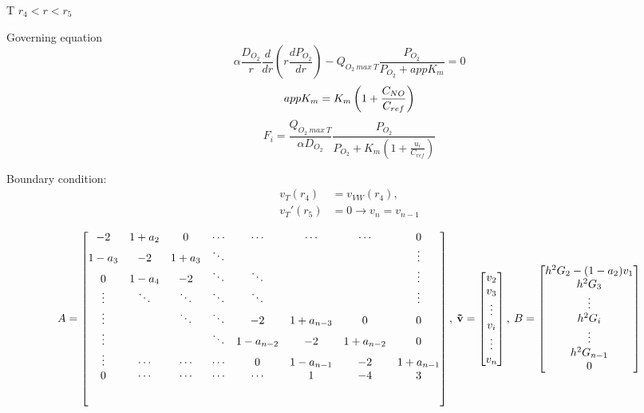 \documentclass[8pt, a4paper]{article}
\begin{document}
  T $r_4<r<r_5$
  
  Governing equation
  \begin{equation*}
  \alpha\frac{D_{O_2}}{r}\frac{d}{dr}\left(r\frac{dP_{O_2}}{dr}\right)-Q_{O_2\:
    max\:T}\frac{P_{O_2}}{P_{O_2}+appK_m}=0
  \end{equation*}
  \begin{equation}
  appK_m=K_m\left(1+\frac{C_{NO}}{C_{ref}}\right)
  \end{equation}
  \begin{equation*}
  F_i=\frac{Q_{O_2\:max\:T}}{\alpha 
    D_{O_2}}\frac{P_{O_2}}{P_{O_2}+K_m\left(1+\frac{u_i}{C_{ref}}\right)}
  \end{equation*}
  
  Boundary condition:
  \begin{align*}
  v_{T}(r_4)&=v_{VW}(r_4),\\
  v_{T}'(r_5)&=0\rightarrow v_n=v_{n-1}
  \end{align*}
  
  \setlength{\extrarowheight}{1.25\baselineskip}
  \begin{equation}
  A=
  \begin{bmatrix}
  -2 & 1+a_2 & 0 & \cdots & \cdots & \cdots & \cdots & 0\\
  1-a_3 & -2 & 1+a_3 & \ddots & & & & \vdots\\
  0 & 1-a_4 & -2 & \ddots & \ddots & &  & \vdots\\
  \vdots & \ddots & \ddots & \ddots & \ddots & & & \vdots\\
  \vdots & & \ddots & \ddots & -2 & 1+a_{n-3} & 0 & 0 \\
  \vdots & & & \ddots & 1-a_{n-2} & -2 & 1+a_{n-2} & 0\\
  \vdots & \cdots & \cdots & \cdots & 0 & 1-a_{n-1} & -2 & 1+a_{n-1}\\
  0 & \cdots & \cdots & \cdots & \cdots & 1 & -4 & 3\\[5ex]
  \end{bmatrix},\:
  \mathbf{\vec{v}}=
  \begin{bmatrix}
  v_2\\
  v_3\\
  \vdots\\
  v_i\\
  \vdots\\
  v_n
  \end{bmatrix},\:
  B=
  \begin{bmatrix}
  h^2G_2-(1-a_2)v_1\\
  h^2G_3\\
  \vdots\\
  h^2G_i\\
  \vdots\\
  h^2G_{n-1}\\
  0
  \end{bmatrix}
  \end{equation}
  
\end{document}
